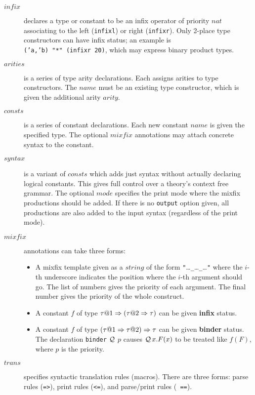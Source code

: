 \begin{description}
\item[$infix$]
  declares a type or constant to be an infix operator of priority $nat$
  associating to the left ({\tt infixl}) or right ({\tt infixr}).  Only
  2-place type constructors can have infix status; an example is {\tt
  ('a,'b)~"*"~(infixr~20)}, which may express binary product types.

\item[$arities$] is a series of type arity declarations.  Each assigns
  arities to type constructors.  The $name$ must be an existing type
  constructor, which is given the additional arity $arity$.
  
\item[$consts$] is a series of constant declarations.  Each new
  constant $name$ is given the specified type.  The optional $mixfix$
  annotations may attach concrete syntax to the constant.
  
\item[$syntax$]  is a variant
  of $consts$ which adds just syntax without actually declaring
  logical constants.  This gives full control over a theory's context
  free grammar.  The optional $mode$ specifies the print mode where the
  mixfix productions should be added.  If there is no \texttt{output}
  option given, all productions are also added to the input syntax
  (regardless of the print mode).

\item[$mixfix$] 
  annotations can take three forms:
  \begin{itemize}
  \item A mixfix template given as a $string$ of the form
    {\tt"}\dots{\tt\_}\dots{\tt\_}\dots{\tt"} where the $i$-th underscore
    indicates the position where the $i$-th argument should go.  The list
    of numbers gives the priority of each argument.  The final number gives
    the priority of the whole construct.

  \item A constant $f$ of type $\tau@1\To(\tau@2\To\tau)$ can be given {\bf
    infix} status.

  \item A constant $f$ of type $(\tau@1\To\tau@2)\To\tau$ can be given {\bf
    binder} status.  The declaration {\tt binder} $\cal Q$ $p$ causes
  ${\cal Q}\,x.F(x)$ to be treated
  like $f(F)$, where $p$ is the priority.
  \end{itemize}

\item[$trans$]
  specifies syntactic translation rules (macros).  There are three forms:
  parse rules ({\tt =>}), print rules ({\tt <=}), and parse/print rules ({\tt
  ==}).


\end{description}
